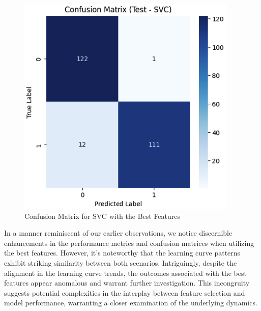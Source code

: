 \documentclass[conference]{IEEEtran}
\begin{document}
\begin{figure}[H]
    \centering
    \includegraphics[width=1\linewidth]{images/ConfusionMatrixSCVBestFeatures.png}
    \caption{Confusion Matrix for SVC with the Best Features}    
    \label{fig:Confusion-SVC-Best}
\end{figure}

In a manner reminiscent of our earlier observations, we notice discernible enhancements in the performance metrics and confusion matrices when utilizing the best features. However, it's noteworthy that the learning curve patterns exhibit striking similarity between both scenarios. Intriguingly, despite the alignment in the learning curve trends, the outcomes associated with the best features appear anomalous and warrant further investigation. This incongruity suggests potential complexities in the interplay between feature selection and model performance, warranting a closer examination of the underlying dynamics.
\end{document}
